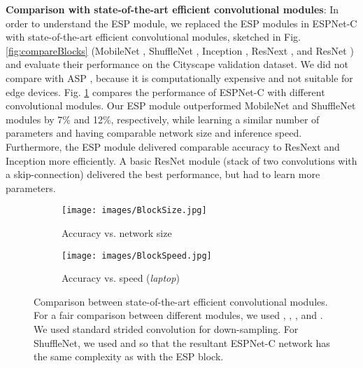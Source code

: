 \documentclass[runningheads]{llncs}
\def\Fig{Fig. }
\begin{document}
\noindent \textbf{Comparison with state-of-the-art efficient convolutional modules}: In order to understand the ESP module, we replaced the ESP modules in ESPNet-C with state-of-the-art efficient convolutional modules, sketched in \Fig \ref{fig:compareBlocks} (MobileNet \cite{howard2017mobilenets}, ShuffleNet \cite{zhang2017shufflenet}, Inception \cite{szegedy2015going,szegedy2016rethinking,SzegedyIV16InceptionV4}, ResNext \cite{xie2017aggregated}, and ResNet \cite{he2016deep}) and evaluate their  performance on the Cityscape validation dataset. We did not compare with ASP \cite{chen2016deeplab}, because it is computationally expensive and not suitable for edge devices. \Fig \ref{fig:blockCompare} compares the performance of ESPNet-C with different convolutional modules. Our ESP module outperformed  MobileNet and ShuffleNet modules by 7\% and 12\%, respectively, while learning a similar number of parameters and having comparable network size and inference speed. Furthermore, the ESP module delivered comparable accuracy to ResNext and Inception more efficiently. A basic ResNet module (stack of two  convolutions with a skip-connection) delivered the best performance, but had to learn  more parameters.

\begin{figure}[b!]
\centering
\begin{subfigure}[b]{0.48\columnwidth}
\centering
\texttt{[image: images/BlockSize.jpg]}
\caption{Accuracy vs. network size}
\end{subfigure}
\hfill
\begin{subfigure}[b]{0.48\columnwidth}
\centering
\texttt{[image: images/BlockSpeed.jpg]}
\caption{Accuracy vs. speed (\textit{laptop})}
\end{subfigure}
\caption{Comparison between state-of-the-art efficient convolutional modules. For a fair comparison between different modules, we used , , , and . We used standard strided convolution for down-sampling. For ShuffleNet, we used  and  so that the resultant ESPNet-C network has the same complexity as with the ESP block.}
\label{fig:blockCompare}
\end{figure}
\end{document}
